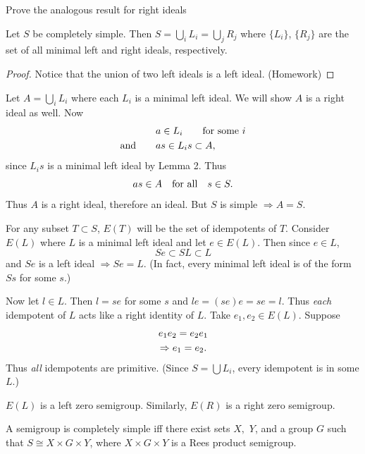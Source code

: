 Prove the analogous result for right ideals

\begin{lemma}    	\label{lem:2.3}
Let $S$ be completely simple.  
Then $S = \bigcup\limits_i L_i = \bigcup\limits_j R_j$ where $\{ L_i\}$,
$\{ R_j\}$ are the set of all minimal left and right ideals,
respectively.
\end{lemma}

\begin{proof}  
Notice that the union of two left ideals is a left
ideal.  (Homework)
\end{proof}

Let $A = \bigcup\limits_i L_i$ where each $L_i$ is a minimal left ideal.  We will show $A$ is a right ideal as well.  
Now
\[
     \aligned
     &a \in L_i \qquad \hbox{for some } i               \\
     \hbox{and} \qquad
          &as \in L_is \subset A,
     \endaligned
\]
since $L_i s$ is a minimal left ideal by Lemma 2.  
Thus
\[
     as \in A \quad \hbox{for all} \quad s \in S.
\]
Thus $A$ is a right ideal, therefore an ideal.  But $S$ is simple
$\Rightarrow A = S$.

For any subset $T \subset S$, $E(T)$ will be the set of idempotents of $T$.  
Consider $E(L)$ where $L$ is a minimal left ideal and let $e \in E(L)$.  
Then since $e \in L$,
\[
     Se \subset SL \subset L
\]
and $Se$ is a left ideal $\Rightarrow Se = L$.  
(In fact, every minimal left ideal is of the form $Ss$ for some $s$.)

Now let $l \in L$.  
Then $l = se$ for some $s$ and $le = (se)e = se = l$.  
Thus {\it each} idempotent of $L$ acts like a right identity of $L$.  Take $e_1,e_2 \in E(L)$.  
Suppose
\[
     \gathered
     e_1e_2 = e_2e_1                                    \\
     \Rightarrow e_1 = e_2.
     \endgathered
\]
Thus {\it all} idempotents are primitive.  (Since $S = \bigcup L_i$,
every idempotent is in some $L$.)

$E(L)$ is a left zero semigroup.  
Similarly, $E(R)$ is a right zero semigroup.

A semigroup is completely simple
iff there exist sets $X,$ $Y$, and a group $G$ such that $S \cong X \times G \times Y$, where $X \times G \times Y$ is a Rees product semigroup.

